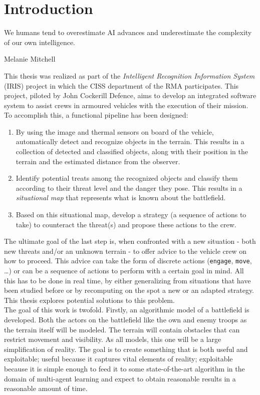 \chapter{Introduction}

\epigraph{We humans tend to overestimate AI advances and underestimate the complexity of our own intelligence.} {Melanie Mitchell}
This thesis was realized as part of the \emph{Intelligent Recognition Information System} (IRIS) project in which the CISS department of the RMA participates. This project, piloted by John Cockerill Defence, aims to develop an integrated software system to assist crews in armoured vehicles with the execution of their mission. To accomplish this, a functional pipeline has been designed:
\begin{enumerate}
    \item By using the image and thermal sensors on board of the vehicle, automatically detect and recognize objects in the terrain. This results in a collection of detected and classified objects, along with their position in the terrain and the estimated distance from the observer. 
    \item Identify potential treats among the recognized objects and classify them according to their threat level and the danger they pose. This results in a \emph{situational map} that represents what is known about the battlefield.
    \item Based on this situational map, develop a strategy (a sequence of actions to take) to counteract the threat(s) and propose these actions to the crew.
\end{enumerate}
The ultimate goal of the last step is, when confronted with a new situation - both new threats and/or an unknown terrain - to offer advice to the vehicle crew on how to proceed. This advice can take the form of discrete actions ({\tt engage}, {\tt move}, \ldots) or can be a sequence of actions to perform with a certain goal in mind. All this has to be done in real time, by either generalizing from situations that have been studied before or by recomputing on the spot a new or an adapted strategy. This thesis explores potential solutions to this problem.\\
The goal of this work is twofold. Firstly, an algorithmic model of a battlefield is developed. Both the actors on the battlefield like the own and enemy troops as the terrain itself will be modeled. The terrain will contain obstacles that can restrict movement and visibility. As all models, this one will be a large simplification of reality. The goal is to create something that is both useful and exploitable; useful because it captures vital elements of reality; exploitable because it is simple enough to feed it to some state-of-the-art algorithm in the domain of multi-agent learning and expect to obtain reasonable results in a reasonable amount of time.\\
